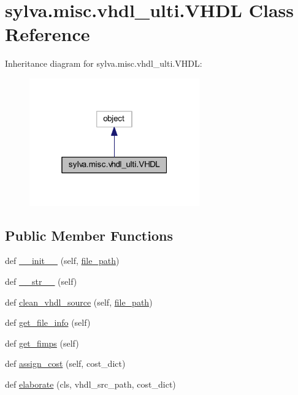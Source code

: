 \hypertarget{classsylva_1_1misc_1_1vhdl__ulti_1_1_v_h_d_l}{}\section{sylva.\+misc.\+vhdl\+\_\+ulti.\+V\+H\+DL Class Reference}
\label{classsylva_1_1misc_1_1vhdl__ulti_1_1_v_h_d_l}


Inheritance diagram for sylva.\+misc.\+vhdl\+\_\+ulti.\+V\+H\+DL\+:\nopagebreak
\begin{figure}[H]
\begin{center}
\leavevmode
\includegraphics[width=208pt]{classsylva_1_1misc_1_1vhdl__ulti_1_1_v_h_d_l__inherit__graph}
\end{center}
\end{figure}
\subsection*{Public Member Functions}
\begin{DoxyCompactItemize}
\item 
def \hyperlink{classsylva_1_1misc_1_1vhdl__ulti_1_1_v_h_d_l_a5eac6d4ee2354babf62a07b7f83d94e7}{\+\_\+\+\_\+init\+\_\+\+\_\+} (self, \hyperlink{classsylva_1_1misc_1_1vhdl__ulti_1_1_v_h_d_l_a04b9fc97616c0decf89e5bc36fdbf879}{file\+\_\+path})
\item 
def \hyperlink{classsylva_1_1misc_1_1vhdl__ulti_1_1_v_h_d_l_a2a6786cbe721ea37e8ada800f5787ba4}{\+\_\+\+\_\+str\+\_\+\+\_\+} (self)
\item 
def \hyperlink{classsylva_1_1misc_1_1vhdl__ulti_1_1_v_h_d_l_a9069beffb43ba444c7aa61902dcff236}{clean\+\_\+vhdl\+\_\+source} (self, \hyperlink{classsylva_1_1misc_1_1vhdl__ulti_1_1_v_h_d_l_a04b9fc97616c0decf89e5bc36fdbf879}{file\+\_\+path})
\item 
def \hyperlink{classsylva_1_1misc_1_1vhdl__ulti_1_1_v_h_d_l_ad90cd226a1be4574ec7fe86b84f9e959}{get\+\_\+file\+\_\+info} (self)
\item 
def \hyperlink{classsylva_1_1misc_1_1vhdl__ulti_1_1_v_h_d_l_a30c77e530f564a64c316e514a22443eb}{get\+\_\+fimps} (self)
\item 
def \hyperlink{classsylva_1_1misc_1_1vhdl__ulti_1_1_v_h_d_l_ad7c048b801d2a2259246cf8d08d37fab}{assign\+\_\+cost} (self, cost\+\_\+dict)
\item 
def \hyperlink{classsylva_1_1misc_1_1vhdl__ulti_1_1_v_h_d_l_a4e4bd98f12b587f047259934db24a2b2}{elaborate} (cls, vhdl\+\_\+src\+\_\+path, cost\+\_\+dict)
\end{DoxyCompactItemize}
